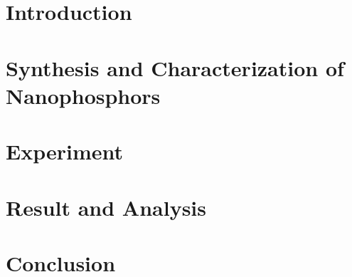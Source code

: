 \documentclass{article}[10pt]
\begin{document}
  \newpage
  \section{Introduction}
    

  \newpage
  \section{Synthesis and Characterization of Nanophosphors}
    
  
  \newpage
  \section{Experiment}
    

  \newpage
  \section{Result and Analysis}
    

  \newpage
  \section*{\centering \huge Conclusion}
    

  \newpage
  
  
\end{document}
